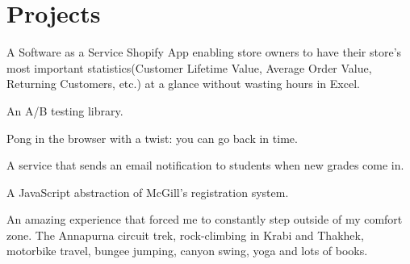 \documentclass[letterpaper]{deedy-resume} %
\begin{document}
\begin{minipage}[t]{0.66\textwidth}
\sectionspace %


\section{Projects}


A Software as a Service Shopify App enabling store owners to have
their store's most important statistics(Customer Lifetime Value,
Average Order Value, Returning Customers, etc.) at a glance without
wasting hours in Excel.
\sectionspace


An A/B testing library.
\sectionspace


Pong in the browser with a twist: you can go back in time.
\sectionspace


A service that sends an email notification to students when new grades
come in.
\sectionspace


A JavaScript abstraction of McGill's registration system.

\sectionspace


An amazing experience that forced me to constantly step outside of my
comfort zone.
The Annapurna circuit trek, rock-climbing in Krabi and Thakhek,
motorbike travel, bungee jumping, canyon swing, yoga and lots
of books.


\end{minipage}
\end{document}
